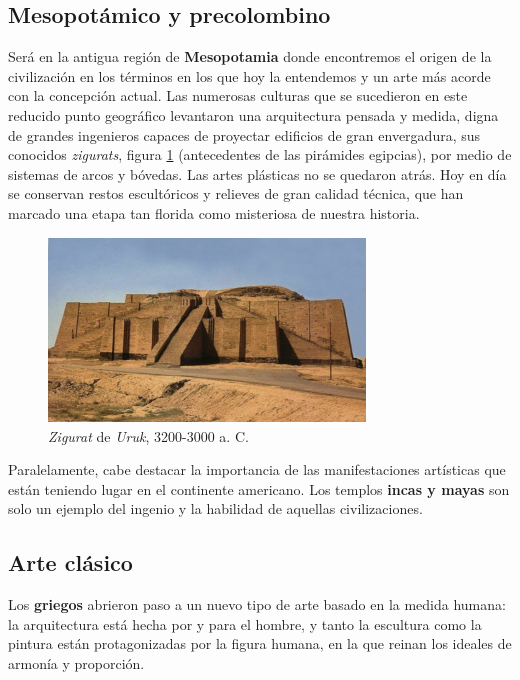 \subsection{Mesopotámico y precolombino}

Será en la antigua región de \textbf{Mesopotamia} donde encontremos el origen de la civilización en los términos en los que hoy la entendemos y un arte más acorde con la concepción actual. Las numerosas culturas que se sucedieron en este reducido punto geográfico levantaron una arquitectura pensada y medida, digna de grandes ingenieros capaces de proyectar edificios de gran envergadura, sus conocidos \textit{zigurats}, figura \ref{fig:zigurat} (antecedentes de las pirámides egipcias), por medio de sistemas de arcos y bóvedas. Las artes plásticas no se quedaron atrás. Hoy en día se conservan restos escultóricos y relieves de gran calidad técnica, que han marcado una etapa tan florida como misteriosa de nuestra historia.

\begin{figure}[!h]
    \begin{center}
        \includegraphics[width=0.75\textwidth]{imagenes/2/zigurat.jpg}
        \caption{\textit{Zigurat} de \textit{Uruk}, 3200-3000 a. C.}
        \label{fig:zigurat}
    \end{center}
\end{figure}

Paralelamente, cabe destacar la importancia de las manifestaciones artísticas que están teniendo lugar en el continente americano. Los templos \textbf{incas y mayas} son solo un ejemplo del ingenio y la habilidad de aquellas civilizaciones.

\subsection{Arte clásico}

Los \textbf{griegos} abrieron paso a un nuevo tipo de arte basado en la medida humana: la arquitectura está hecha por y para el hombre, y tanto la escultura como la pintura están protagonizadas por la figura humana, en la que reinan los ideales de armonía y proporción. 

